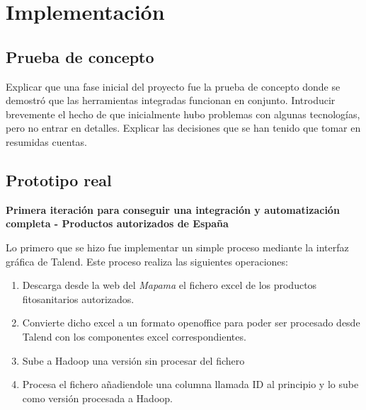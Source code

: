 \chapter{Implementación}
\section{Prueba de concepto}
Explicar que una fase inicial del proyecto fue la prueba de concepto donde se demostró que las herramientas integradas funcionan en conjunto. Introducir brevemente el hecho de que inicialmente hubo problemas con algunas tecnologías, pero no entrar en detalles. Explicar las decisiones que se han tenido que tomar en resumidas cuentas.


\section{Prototipo real}



\par 
\textbf{Primera iteración para conseguir una integración y automatización completa - Productos autorizados de España}
\bigskip
\par Lo primero que se hizo fue implementar un simple proceso mediante la interfaz gráfica de Talend. Este proceso realiza las siguientes operaciones: 
\begin{enumerate}
\item Descarga desde la web del \textit{Mapama} el fichero excel de los productos fitosanitarios autorizados.
\item Convierte dicho excel a un formato openoffice para poder ser procesado desde Talend con los componentes excel correspondientes. 
\item Sube a Hadoop una versión sin procesar del fichero
\item Procesa el fichero añadiendole una columna llamada ID al principio y lo sube como versión procesada a Hadoop. 
\end{enumerate} 


